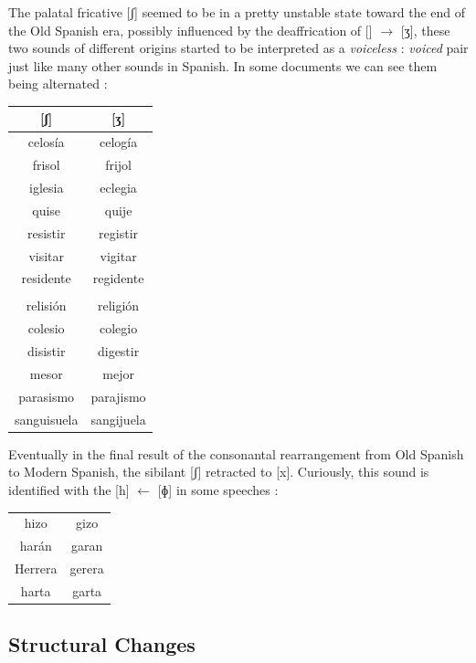 \documentclass{report}[12pt]
\begin{document}
The palatal fricative [ʃ] seemed to be in a pretty unstable state toward the end of the Old Spanish era, possibly influenced by the deaffrication of [\textipa{\textdyoghlig}] $\rightarrow$ [ʒ], these two sounds of different origins started to be interpreted as a \emph{voiceless} : \emph{voiced} pair just like many other sounds in Spanish. In some documents we can see them being alternated \parencite[p.~342]{lloyd_spanish}:
\begin{center}
  \begin{tabular}{c c}
    [ʃ] & [ʒ] \\
    \hline
    celosía & celogía \\
    frisol & frijol \\
    iglesia & eclegia \\
    quise & quije \\
    resistir & registir \\
    visitar & vigitar \\
    residente & regidente \\
        & \\
    relisión & religión \\
    colesio & colegio \\
    disistir & digestir \\
    mesor & mejor \\
    parasismo & parajismo \\
    sanguisuela & sangijuela \\
  \end{tabular}
\end{center}
Eventually in the final result of the consonantal rearrangement from Old Spanish to Modern Spanish, the sibilant [ʃ] retracted to [x]. Curiously, this sound is identified with the [h] $\leftarrow$ [ɸ] in some speeches \parencite[p.~343]{lloyd_spanish}:
\begin{center}
  \begin{tabular}{c c}
    hizo & gizo \\
    harán & garan \\
    Herrera & gerera \\
    harta & garta \\
  \end{tabular}
\end{center}

\subsection{Structural Changes}
\end{document}
